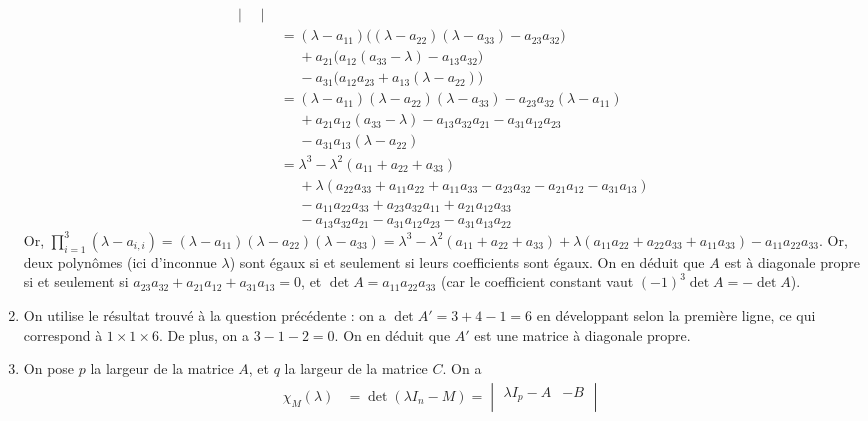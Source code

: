 \documentclass[a4paper]{article}
\begin{document}
\begin{enumerate}
\begin{align*}
\begin{vmatrix}
				\end{vmatrix}\\
				&= (\lambda - a_{11})\big((\lambda - a_{22})(\lambda-a_{33})-a_{23}a_{32}\big)\\
				&\mathrel{\phantom{=}}{}+ a_{21}\big(a_{12}(a_{33}-\lambda) - a_{13}a_{32} \big) \\
				&\mathrel{\phantom{=}}{}- a_{31}\big(a_{12}a_{23} + a_{13}(\lambda-a_{22})\big)\\
				&= (\lambda-a_{11})(\lambda-a_{22})(\lambda-a_{33}) - a_{23}a_{32}(\lambda - a_{11})\\
				&\mathrel{\phantom{=}}{}+ a_{21}a_{12}(a_{33}-\lambda) - a_{13}a_{32}a_{21} - a_{31}a_{12}a_{23}\\
				&\mathrel{\phantom{=}}{}- a_{31}a_{13}(\lambda-a_{22}) \\
				&= \lambda^3 - \lambda^2(a_{11}+a_{22}+a_{33})\\
				&\mathrel{\phantom{=}}{}+ \lambda(a_{22}a_{33} + a_{11}a_{22} + a_{11}a_{33} - a_{23}a_{32} - a_{21}a_{12} - a_{31}a_{13})\\
				&\mathrel{\phantom{=}}{}-a_{11}a_{22}a_{33} + a_{23}a_{32}a_{11} + a_{21}a_{12}a_{33}\\
				&\mathrel{\phantom{=}}{}- a_{13}a_{32}a_{21}-a_{31}a_{12}a_{23} - a_{31}a_{13}a_{22}
			\end{align*}
			Or, $\prod_{i=1}^3(\lambda-a_{i,i}) = (\lambda-a_{11})(\lambda-a_{22})(\lambda-a_{33}) = \lambda^3 - \lambda^2(a_{11} + a_{22} + a_{33}) + \lambda(a_{11}a_{22} + a_{22}a_{33} + a_{11}a_{33}) - a_{11}a_{22}a_{33}$. Or, deux polynômes (ici d'inconnue $\lambda$) sont égaux si et seulement si leurs coefficients sont égaux. On en déduit que $A$\/ est à diagonale propre si et seulement si $a_{23}a_{32} + a_{21}a_{12}+a_{31}a_{13} = 0$, et $\det A = a_{11}a_{22}a_{33}$\/ (car le coefficient constant vaut $(-1)^3 \det A = - \det A$).
		\item On utilise le résultat trouvé à la question précédente : on a $\det A' = 3 + 4 - 1 = 6$ en développant selon la première ligne, ce qui correspond à $1 \times 1 \times 6$. De plus, on a $3 - 1 - 2 = 0$. On en déduit que $A'$\/ est une matrice à diagonale propre.
		\item On pose $p$\/ la largeur de la matrice $A$, et $q$\/ la largeur de la matrice $C$. On a
			\begin{align*}
				\chi_M(\lambda) &= \det(\lambda I_n - M) =
				\begin{vmatrix}
					\lambda I_p - A & -B\\

\end{vmatrix}
\end{align*}
\end{enumerate}
\end{document}
